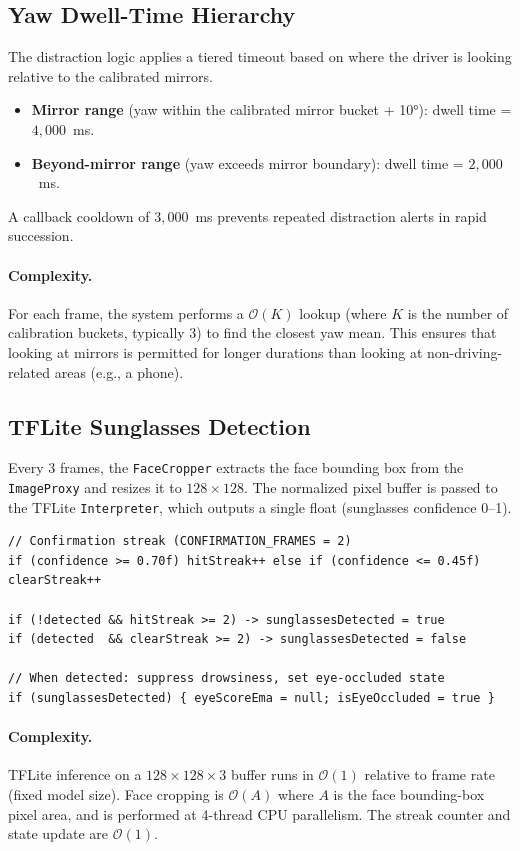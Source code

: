 \documentclass[11pt]{report}
\begin{document}
\subsection{Yaw Dwell-Time Hierarchy}\label{subsec:yaw-algo}
The distraction logic applies a tiered timeout based on where the driver is looking relative to the calibrated mirrors.
\begin{itemize}
    \item \textbf{Mirror range} (yaw within the calibrated mirror bucket + 10°): dwell time = $4{,}000$~ms.
    \item \textbf{Beyond-mirror range} (yaw exceeds mirror boundary): dwell time = $2{,}000$~ms.
\end{itemize}
A callback cooldown of $3{,}000$~ms prevents repeated distraction alerts in rapid succession.

\paragraph{Complexity.}
For each frame, the system performs a $\mathcal{O}(K)$ lookup (where $K$ is the number of calibration buckets, typically 3) to find the closest yaw mean. This ensures that looking at mirrors is permitted for longer durations than looking at non-driving-related areas (e.g., a phone).

\subsection{TFLite Sunglasses Detection}\label{subsec:sunglasses-algo}
Every 3 frames, the \texttt{FaceCropper} extracts the face bounding box from the \texttt{ImageProxy} and resizes it to $128 \times 128$. The normalized pixel buffer is passed to the TFLite \texttt{Interpreter}, which outputs a single float (sunglasses confidence 0–1).

\begin{verbatim}
// Confirmation streak (CONFIRMATION_FRAMES = 2)
if (confidence >= 0.70f) hitStreak++ else if (confidence <= 0.45f) clearStreak++

if (!detected && hitStreak >= 2) -> sunglassesDetected = true
if (detected  && clearStreak >= 2) -> sunglassesDetected = false

// When detected: suppress drowsiness, set eye-occluded state
if (sunglassesDetected) { eyeScoreEma = null; isEyeOccluded = true }
\end{verbatim}

\paragraph{Complexity.}
TFLite inference on a $128 \times 128 \times 3$ buffer runs in $\mathcal{O}(1)$ relative to frame rate (fixed model size). Face cropping is $\mathcal{O}(A)$ where $A$ is the face bounding-box pixel area, and is performed at 4-thread CPU parallelism. The streak counter and state update are $\mathcal{O}(1)$.
\end{document}
